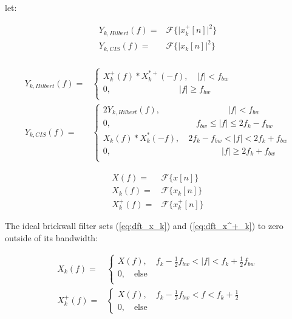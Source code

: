 \documentclass [11pt, proquest,oneside] {ganter_thesis}[2015/03/03]
\begin{document}
let:

\begin{align}
\label{eq:hilbert_squared}
Y_{k,Hilbert}(f) =& \mathcal{F}\Big\{ \Big| x^+_k[n] \Big|^2  \Big\} \\
\label{eq:cis_squared_prefilter}
Y_{k,CIS}(f) =& \mathcal{F}\Big\{ \Big| x_k[n] \Big|^2  \Big\} \\
\end{align}

\begin{align}
Y_{k,Hilbert}(f) =& \left\{
			 \begin{array}{ll}
X^+_{k}(f) * X^{*+}_{k}(-f), \quad |f| < f_{bw} \\
0, \qquad \qquad \qquad \qquad |f| \geq f_{bw} \\
                \end{array}
               \right. \\
Y_{k,CIS}(f) =& \left\{
			 \begin{array}{ll}
2Y_{k,Hilbert}(f), \quad \qquad \qquad \qquad \quad |f| < f_{bw} \\
0, \qquad \qquad \qquad \qquad \qquad  f_{bw} \leq |f| \leq 2f_k - f_{bw}  \\
X_{k}(f) * X^*_{k}(-f), \quad 2f_k - f_{bw} < |f| < 2f_k + f_{bw} \\
0, \qquad \qquad \qquad \qquad \qquad \quad \qquad |f| \geq 2f_k + f_{bw}  \\
                \end{array}
               \right.
\end{align}






\begin{align}
X(f) =& \mathcal{F}\Big\{ x[n] \Big\} \\
X_{k}(f) =& \mathcal{F}\Big\{ x_k[n] \Big\} \\
X^+_{k}(f) =& \mathcal{F}\Big\{ x^+_k[n]  \Big\}
\end{align}

The ideal brickwall filter sets (\ref{eq:dft_x_k}) and (\ref{eq:dft_x^+_k}) to zero outside of its bandwidth:

\begin{align}
X_{k}(f) =& \left\{
                \begin{array}{ll}
X(f), \quad f_k - \frac{1}{2} f_{bw} < |f| < f_k + \frac{1}{2} f_{bw} \\
0, \quad \mathrm{else} \\
                \end{array}
              \right. \\
X^+_{k}(f) =& \left\{
                \begin{array}{ll}
X(f), \quad f_k - \frac{1}{2} f_{bw} < f < f_k + \frac{1}{2} \\
0, \quad \mathrm{else}
                \end{array}
              \right.
\end{align}
\end{document}
